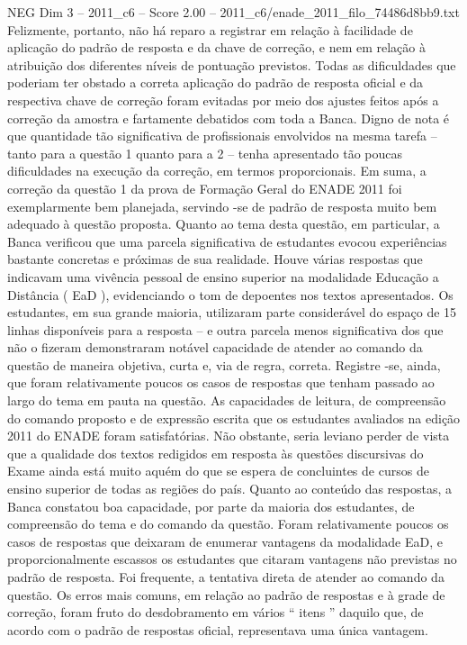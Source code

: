 \begin{textsample}{NEG Dim 3 – 2011\_c6 – Score 2.00 – 2011\_c6/enade\_2011\_filo\_74486d8bb9.txt}
Felizmente, portanto, não há reparo a registrar em relação à facilidade de aplicação do padrão de resposta e da chave de correção, e nem em relação à atribuição dos diferentes níveis de pontuação previstos.
Todas as dificuldades que poderiam ter obstado a correta aplicação do padrão de resposta oficial e da respectiva chave de correção foram evitadas por meio dos ajustes feitos após a correção da amostra e fartamente debatidos com toda a Banca.
Digno de nota é que quantidade tão significativa de profissionais envolvidos na mesma tarefa – tanto para a questão 1 quanto para a 2 – tenha apresentado tão poucas dificuldades na execução da correção, em termos proporcionais.
Em suma, a correção da questão 1 da prova de Formação Geral do ENADE 2011 foi exemplarmente bem planejada, servindo -se de padrão de resposta muito bem adequado à questão proposta.
Quanto ao tema desta questão, em particular, a Banca verificou que uma parcela significativa de estudantes evocou experiências bastante concretas e próximas de sua realidade.
Houve várias respostas que indicavam uma vivência pessoal de ensino superior na modalidade Educação a Distância ( EaD ), evidenciando o tom de depoentes nos textos apresentados.
Os estudantes, em sua grande maioria, utilizaram parte considerável do espaço de 15 linhas disponíveis para a resposta – e outra parcela menos significativa dos que não o fizeram demonstraram notável capacidade de atender ao comando da questão de maneira objetiva, curta e, via de regra, correta.
Registre -se, ainda, que foram relativamente poucos os casos de respostas que tenham passado ao largo do tema em pauta na questão.
As capacidades de leitura, de compreensão do comando proposto e de expressão escrita que os estudantes avaliados na edição 2011 do ENADE foram satisfatórias.
Não obstante, seria leviano perder de vista que a qualidade dos textos redigidos em resposta às questões discursivas do Exame ainda está muito aquém do que se espera de concluintes de cursos de ensino superior de todas as regiões do país.
Quanto ao conteúdo das respostas, a Banca constatou boa capacidade, por parte da maioria dos estudantes, de compreensão do tema e do comando da questão.
Foram relativamente poucos os casos de respostas que deixaram de enumerar vantagens da modalidade EaD, e proporcionalmente escassos os estudantes que citaram vantagens não previstas no padrão de resposta.
Foi frequente, a tentativa direta de atender ao comando da questão.
Os erros mais comuns, em relação ao padrão de respostas e à grade de correção, foram fruto do desdobramento em vários “ itens ” daquilo que, de acordo com o padrão de respostas oficial, representava uma única vantagem.

\end{textsample}
